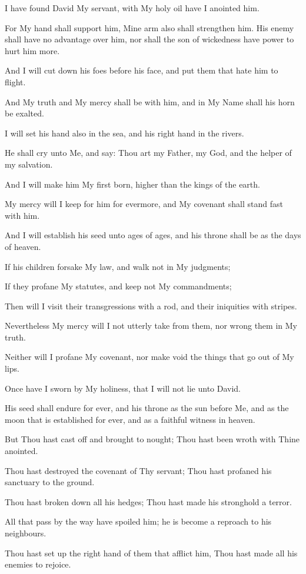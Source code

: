 I have found David My servant, with My holy oil have I anointed him.

For My hand shall support him, Mine arm also shall strengthen him. His enemy shall have no advantage over him, nor shall the son of wickedness have power to hurt him more.

And I will cut down his foes before his face, and put them that hate him to flight.

And My truth and My mercy shall be with him, and in My Name shall his horn be exalted.

I will set his hand also in the sea, and his right hand in the rivers.

He shall cry unto Me, and say: Thou art my Father, my God, and the helper of my salvation.

And I will make him My first born, higher than the kings of the earth.

My mercy will I keep for him for evermore, and My covenant shall stand fast with him.

And I will establish his seed unto ages of ages, and his throne shall be as the days of heaven.

If his children forsake My law, and walk not in My judgments;

If they profane My statutes, and keep not My commandments;

Then will I visit their transgressions with a rod, and their iniquities with stripes.

Nevertheless My mercy will I not utterly take from them, nor wrong them in My truth.

Neither will I profane My covenant, nor make void the things that go out of My lips.

Once have I sworn by My holiness, that I will not lie unto David.

His seed shall endure for ever, and his throne as the sun before Me, and as the moon that is established for ever, and as a faithful witness in heaven.

But Thou hast cast off and brought to nought; Thou hast been wroth with Thine anointed.

Thou hast destroyed the covenant of Thy servant; Thou hast profaned his sanctuary to the ground.

Thou hast broken down all his hedges; Thou hast made his stronghold a terror.

All that pass by the way have spoiled him; he is become a reproach to his neighbours.

Thou hast set up the right hand of them that afflict him, Thou hast made all his enemies to rejoice.

